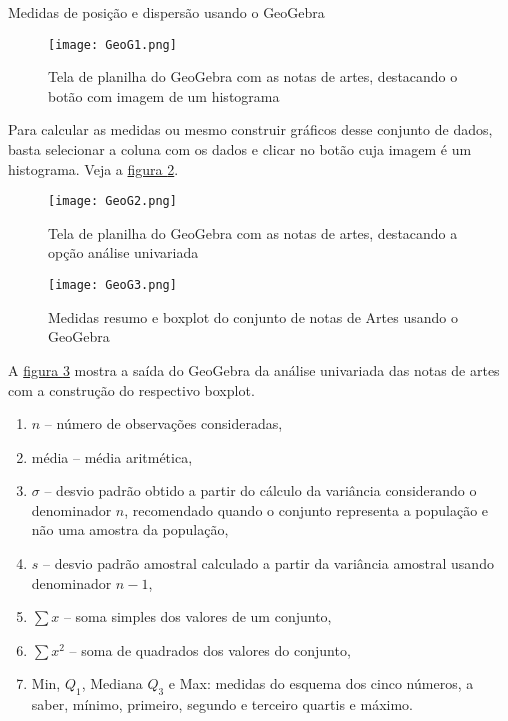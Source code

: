 {{{\begin{example}{Medidas de posição e dispersão usando o GeoGebra}
\begin{figure}[H]
\centering

\texttt{[image: GeoG1.png]}
\caption{Tela de planilha do GeoGebra com as notas de artes, destacando o botão com imagem de um histograma}
\label{GeoG1}
\end{figure}

Para calcular as medidas ou mesmo construir gráficos desse conjunto de dados, basta selecionar a coluna com os dados e clicar no botão cuja imagem é um histograma. Veja a \hyperref[GeoG2]{figura \ref{GeoG2}}.

\begin{figure}[H]
\centering

\texttt{[image: GeoG2.png]}
\caption{Tela de planilha do GeoGebra com as notas de artes, destacando a opção análise univariada}
\label{GeoG2}
\end{figure}

\begin{figure}[H]
\centering

\texttt{[image: GeoG3.png]}
\caption{Medidas resumo e boxplot do conjunto de notas de Artes usando o GeoGebra}
\label{GeoG3}
\end{figure}

A \hyperref[GeoG3]{figura \ref{GeoG3}} mostra a saída do GeoGebra da análise univariada das notas de artes com a construção do respectivo boxplot.

\begin{enumerate}
\item $n$ -- número de observações consideradas,
\item média -- média aritmética,
\item $\sigma$ -- desvio padrão obtido a partir do cálculo da variância considerando o denominador $n$, recomendado quando o conjunto representa a população e não uma amostra da população,
\item $s$ -- desvio padrão amostral calculado a partir da variância amostral usando denominador $n-1$,
\item $\sum x$ -- soma simples dos valores de um conjunto,
\item $\sum x^2$ -- soma de quadrados dos valores do conjunto,
\item Min, $Q_1$, Mediana $Q_3$ e Max: medidas do esquema dos cinco números, a saber, mínimo, primeiro, segundo e terceiro quartis e máximo.
\end{enumerate}
\end{example}


}}}
